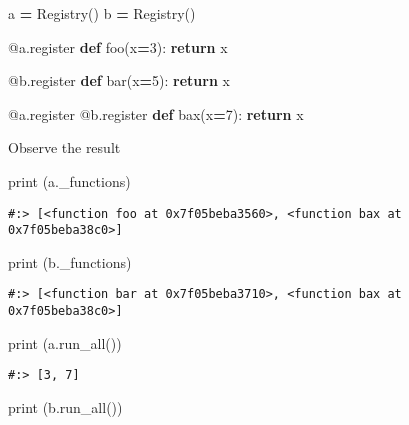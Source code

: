 \documentclass[
]{book}
\newenvironment{Shaded}{\begin{snugshade}}{\end{snugshade}}
\newcommand{\AttributeTok}[1]{\textcolor[rgb]{0.61,0.61,0.61}{#1}}
\newcommand{\BuiltInTok}[1]{#1}
\newcommand{\ControlFlowTok}[1]{\textcolor[rgb]{0.27,0.27,0.27}{\textbf{#1}}}
\newcommand{\DecValTok}[1]{\textcolor[rgb]{0.06,0.06,0.06}{#1}}
\newcommand{\KeywordTok}[1]{\textcolor[rgb]{0.27,0.27,0.27}{\textbf{#1}}}
\newcommand{\NormalTok}[1]{#1}
\newcommand{\OperatorTok}[1]{\textcolor[rgb]{0.43,0.43,0.43}{\textbf{#1}}}
\begin{document}
\begin{Shaded}
\begin{Highlighting}[]
\NormalTok{a }\OperatorTok{=}\NormalTok{ Registry()}
\NormalTok{b }\OperatorTok{=}\NormalTok{ Registry()}

\AttributeTok{@a.register}
\KeywordTok{def}\NormalTok{ foo(x}\OperatorTok{=}\DecValTok{3}\NormalTok{):}
    \ControlFlowTok{return}\NormalTok{ x}

\AttributeTok{@b.register}
\KeywordTok{def}\NormalTok{ bar(x}\OperatorTok{=}\DecValTok{5}\NormalTok{):}
    \ControlFlowTok{return}\NormalTok{ x}

\AttributeTok{@a.register}
\AttributeTok{@b.register}
\KeywordTok{def}\NormalTok{ bax(x}\OperatorTok{=}\DecValTok{7}\NormalTok{):}
    \ControlFlowTok{return}\NormalTok{ x}
\end{Highlighting}
\end{Shaded}

Observe the result

\begin{Shaded}
\begin{Highlighting}[]
\BuiltInTok{print}\NormalTok{ (a.\_functions)}
\end{Highlighting}
\end{Shaded}

\begin{verbatim}
#:> [<function foo at 0x7f05beba3560>, <function bax at 0x7f05beba38c0>]
\end{verbatim}

\begin{Shaded}
\begin{Highlighting}[]
\BuiltInTok{print}\NormalTok{ (b.\_functions)}
\end{Highlighting}
\end{Shaded}

\begin{verbatim}
#:> [<function bar at 0x7f05beba3710>, <function bax at 0x7f05beba38c0>]
\end{verbatim}

\begin{Shaded}
\begin{Highlighting}[]
\BuiltInTok{print}\NormalTok{ (a.run\_all())}
\end{Highlighting}
\end{Shaded}

\begin{verbatim}
#:> [3, 7]
\end{verbatim}

\begin{Shaded}
\begin{Highlighting}[]
\BuiltInTok{print}\NormalTok{ (b.run\_all())}
\end{Highlighting}
\end{Shaded}
\end{document}
